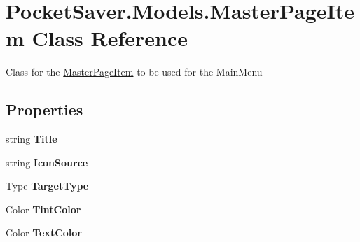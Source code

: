 \hypertarget{class_pocket_saver_1_1_models_1_1_master_page_item}{}\section{Pocket\+Saver.\+Models.\+Master\+Page\+Item Class Reference}
\label{class_pocket_saver_1_1_models_1_1_master_page_item}


Class for the \hyperlink{class_pocket_saver_1_1_models_1_1_master_page_item}{Master\+Page\+Item} to be used for the Main\+Menu  


\subsection*{Properties}
\begin{DoxyCompactItemize}
\item 
\mbox{\label{class_pocket_saver_1_1_models_1_1_master_page_item_a7c4154175a757c8f49d03383ea4ada42}} 
string {\bfseries Title}
\item 
\mbox{\label{class_pocket_saver_1_1_models_1_1_master_page_item_ae0a4719e8a071c3bcdee7779f8b9a06c}} 
string {\bfseries Icon\+Source}
\item 
\mbox{\label{class_pocket_saver_1_1_models_1_1_master_page_item_a9b4bfe18eed3308bc5746f466fee3138}} 
Type {\bfseries Target\+Type}
\item 
\mbox{\label{class_pocket_saver_1_1_models_1_1_master_page_item_a704c85abfb9f9dca31506e8109a7c560}} 
Color {\bfseries Tint\+Color}
\item 
\mbox{\label{class_pocket_saver_1_1_models_1_1_master_page_item_a49ed7484c31708efa54d6309096d4e8b}} 
Color {\bfseries Text\+Color}
\end{DoxyCompactItemize}


